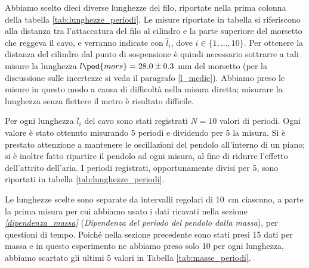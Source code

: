 Abbiamo scelto dieci diverse lunghezze del filo, riportate nella prima colonna della tabella \ref{tab:lunghezze_periodi}.
Le misure riportate in tabella si riferiscono alla distanza tra l'attaccatura del filo al cilindro e la parte superiore
del morsetto che reggeva il cavo, e verranno indicate con $\bar{l}_i$, dove $i \in \{1, \dots, 10\}$.
Per ottenere la distanza del cilindro dal punto di sospensione è quindi necessario sottrarre a tali misure
la lunghezza $l\ped{mors} = 28.0 \pm 0.3$ mm del morsetto (per la discussione sulle incertezze si veda il paragrafo
\ref{l_medie}). Abbiamo preso le misure in questo modo a causa di difficoltà nella misura diretta;
misurare la lunghezza senza flettere il metro è risultato difficile.

Per ogni lunghezza $\bar{l}_i$ del cavo sono stati registrati $N = 10$ valori di periodi. Ogni valore è stato ottenuto
misurando 5 periodi e dividendo per 5 la misura. Si è prestato attenzione a mantenere le oscillazioni del pendolo
all'interno di un piano; si è inoltre fatto ripartire il pendolo ad ogni misura, al fine di ridurre l'effetto dell'attrito
dell'aria. I periodi registrati, opportunamente divisi per 5, sono riportati in tabella \ref{tab:lunghezze_periodi}.

Le lunghezze scelte sono separate da intervalli regolari di \SI{10}{\centi\metre} ciascuno, a parte la prima
misura per cui abbiamo usato i dati ricavati nella sezione \emph{\ref{dipendenza_massa}} (\emph{Dipendenza del periodo del pendolo dalla massa}), per questioni di tempo.
Poiché nella sezione precedente sono stati presi 15 dati per massa e in questo esperimento ne abbiamo preso solo 10
per ogni lunghezza, abbiamo scartato gli ultimi 5 valori in Tabella \ref{tab:masse_periodi}.

